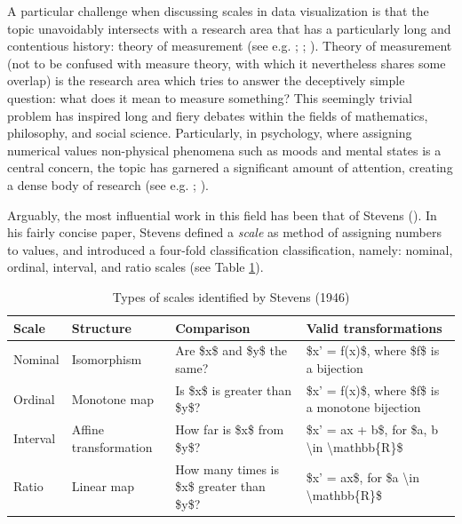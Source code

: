 \documentclass[
]{book}
\begin{document}
A particular challenge when discussing scales in data visualization is that the topic unavoidably intersects with a research area that has a particularly long and contentious history: theory of measurement (see e.g. ; ; ). Theory of measurement (not to be confused with measure theory, with which it nevertheless shares some overlap) is the research area which tries to answer the deceptively simple question: what does it mean to measure something? This seemingly trivial problem has inspired long and fiery debates within the fields of mathematics, philosophy, and social science. Particularly, in psychology, where assigning numerical values non-physical phenomena such as moods and mental states is a central concern, the topic has garnered a significant amount of attention, creating a dense body of research (see e.g. ; ).

Arguably, the most influential work in this field has been that of Stevens (). In his fairly concise paper, Stevens defined a \emph{scale} as method of assigning numbers to values, and introduced a four-fold classification classification, namely: nominal, ordinal, interval, and ratio scales (see Table \ref{tab:stevens-scales}).

\begin{table}

\caption{\label{tab:stevens-scales}Types of scales identified by Stevens (1946)}
\centering
\begin{tabular}[t]{l|l|l|l}
\hline
Scale & Structure & Comparison & Valid transformations\\
\hline
Nominal & Isomorphism & Are \$x\$ and \$y\$ the same? & \$x' = f(x)\$, where \$f\$ is a bijection\\
\hline
Ordinal & Monotone map & Is \$x\$ is greater than \$y\$? & \$x' = f(x)\$, where \$f\$ is a monotone bijection\\
\hline
Interval & Affine transformation & How far is \$x\$ from \$y\$? & \$x' = ax + b\$, for \$a, b \textbackslash{}in \textbackslash{}mathbb\{R\}\$\\
\hline
Ratio & Linear map & How many times is \$x\$ greater than \$y\$? & \$x' = ax\$, for \$a \textbackslash{}in \textbackslash{}mathbb\{R\}\$\\
\hline
\end{tabular}
\end{table}
\end{document}
